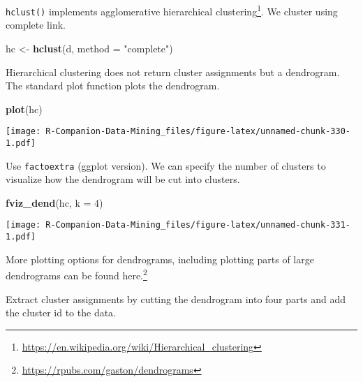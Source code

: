 \documentclass[
  notitlepage]{book}
\newenvironment{Shaded}{\begin{snugshade}}{\end{snugshade}}
\newcommand{\DataTypeTok}[1]{\textcolor[rgb]{0.13,0.29,0.53}{#1}}
\newcommand{\DecValTok}[1]{\textcolor[rgb]{0.00,0.00,0.81}{#1}}
\newcommand{\KeywordTok}[1]{\textcolor[rgb]{0.13,0.29,0.53}{\textbf{#1}}}
\newcommand{\NormalTok}[1]{#1}
\newcommand{\StringTok}[1]{\textcolor[rgb]{0.31,0.60,0.02}{#1}}
\DeclareRobustCommand{\href}[2]{#2\footnote{\url{#1}}}
\begin{document}
\texttt{hclust()} implements \href{https://en.wikipedia.org/wiki/Hierarchical_clustering}{agglomerative hierarchical
clustering}. We
cluster using complete link.

\begin{Shaded}
\begin{Highlighting}[]
\NormalTok{hc \textless{}{-}}\StringTok{ }\KeywordTok{hclust}\NormalTok{(d, }\DataTypeTok{method =} \StringTok{"complete"}\NormalTok{)}
\end{Highlighting}
\end{Shaded}

Hierarchical clustering does not return cluster assignments but a
dendrogram. The standard plot function plots the dendrogram.

\begin{Shaded}
\begin{Highlighting}[]
\KeywordTok{plot}\NormalTok{(hc)}
\end{Highlighting}
\end{Shaded}

\texttt{[image: R-Companion-Data-Mining\_files/figure-latex/unnamed-chunk-330-1.pdf]}

Use \texttt{factoextra} (ggplot version). We can specify the number of clusters
to visualize how the dendrogram will be cut into clusters.

\begin{Shaded}
\begin{Highlighting}[]
\KeywordTok{fviz\_dend}\NormalTok{(hc, }\DataTypeTok{k =} \DecValTok{4}\NormalTok{)}
\end{Highlighting}
\end{Shaded}

\texttt{[image: R-Companion-Data-Mining\_files/figure-latex/unnamed-chunk-331-1.pdf]}

More plotting options for dendrograms, including plotting parts of large
dendrograms can be found \href{https://rpubs.com/gaston/dendrograms}{here.}

Extract cluster assignments by cutting the dendrogram into four parts
and add the cluster id to the data.
\end{document}
